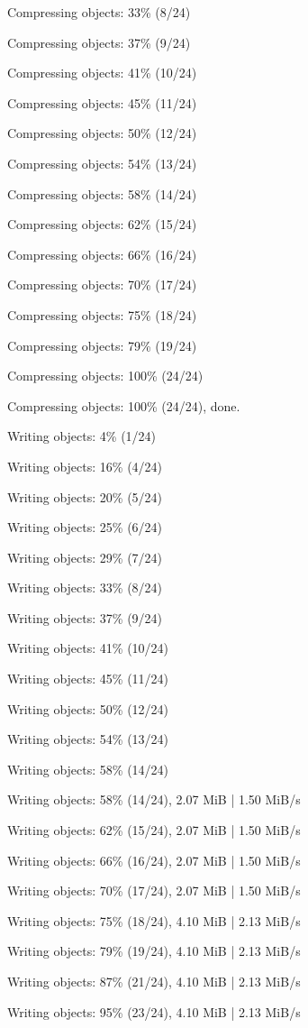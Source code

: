 \documentclass[11pt,a4paper]{article}
\begin{document}
Compressing objects:  33\% (8/24)

Compressing objects:  37\% (9/24)

Compressing objects:  41\% (10/24)

Compressing objects:  45\% (11/24)

Compressing objects:  50\% (12/24)

Compressing objects:  54\% (13/24)

Compressing objects:  58\% (14/24)

Compressing objects:  62\% (15/24)

Compressing objects:  66\% (16/24)

Compressing objects:  70\% (17/24)

Compressing objects:  75\% (18/24)

Compressing objects:  79\% (19/24)

Compressing objects: 100\% (24/24)

Compressing objects: 100\% (24/24), done.

Writing objects:   4\% (1/24)

Writing objects:  16\% (4/24)

Writing objects:  20\% (5/24)

Writing objects:  25\% (6/24)

Writing objects:  29\% (7/24)

Writing objects:  33\% (8/24)

Writing objects:  37\% (9/24)

Writing objects:  41\% (10/24)

Writing objects:  45\% (11/24)

Writing objects:  50\% (12/24)

Writing objects:  54\% (13/24)

Writing objects:  58\% (14/24)

Writing objects:  58\% (14/24), 2.07 MiB | 1.50 MiB/s

Writing objects:  62\% (15/24), 2.07 MiB | 1.50 MiB/s

Writing objects:  66\% (16/24), 2.07 MiB | 1.50 MiB/s

Writing objects:  70\% (17/24), 2.07 MiB | 1.50 MiB/s

Writing objects:  75\% (18/24), 4.10 MiB | 2.13 MiB/s

Writing objects:  79\% (19/24), 4.10 MiB | 2.13 MiB/s

Writing objects:  87\% (21/24), 4.10 MiB | 2.13 MiB/s

Writing objects:  95\% (23/24), 4.10 MiB | 2.13 MiB/s
\end{document}
